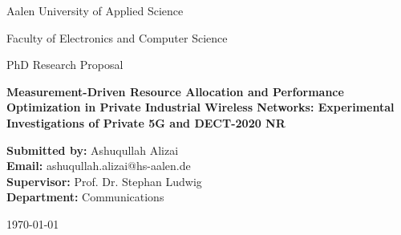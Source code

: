 \documentclass[12pt,a4paper]{article}
\begin{document}
\begin{titlepage}
    \centering
    
    {\Large Aalen University of Applied Science \par}
    \vspace{0.5cm}
    {\large Faculty of Electronics and Computer Science \par}
      \vspace{1cm}
    {\Large PhD Research Proposal \par}
    \vspace{6cm}
    
    {\Huge \textbf{Measurement-Driven Resource Allocation and Performance Optimization in Private Industrial Wireless Networks: Experimental Investigations of Private 5G and DECT-2020 NR} \par}
    
    \vspace{1.5cm}
    
    
    
    \vspace{3cm}
    
    \begin{flushleft}
    \textbf{Submitted by:} Ashuqullah Alizai \\
    \textbf{Email:} ashuqullah.alizai@hs-aalen.de\\
    \textbf{Supervisor:} Prof. Dr. Stephan Ludwig \\
    \textbf{Department:} Communications  \\
    \end{flushleft}
    
    \vfill
    
    {\large \today \par}
    
\end{titlepage}
\end{document}
